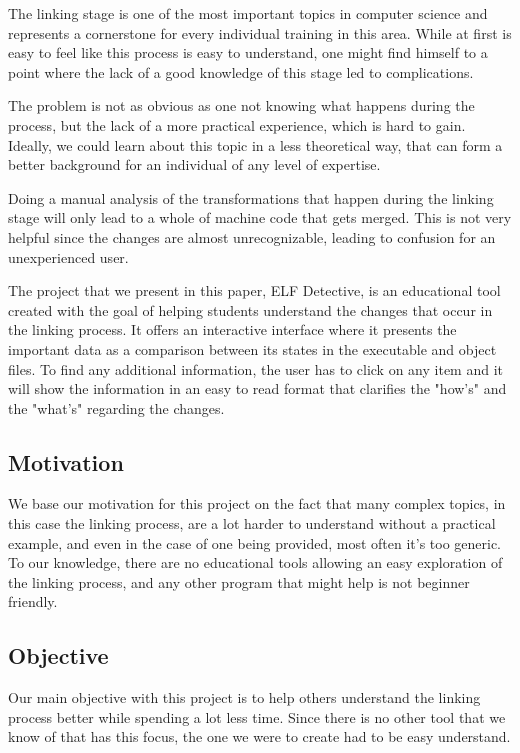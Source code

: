 The linking stage is one of the most important topics in computer science and represents a cornerstone for every individual training in this area. While at first is easy to feel like this process is easy to understand, one might find himself to a point where the lack of a good knowledge of this stage led to complications.

The problem is not as obvious as one not knowing what happens during the process, but the lack of a more practical experience, which is hard to gain. Ideally, we could learn about this topic in a less theoretical way, that can form a better background for an individual of any level of expertise. 

Doing a manual analysis of the transformations that happen during the linking stage will only lead to  a whole of machine code that gets merged. This is not very helpful since the changes are almost unrecognizable, leading to confusion for an unexperienced user.

The project that we present in this paper, ELF Detective, is an educational tool created with the goal of helping students understand the changes that occur in the linking process. It offers an interactive interface where it presents the important data as a comparison between its states in the executable and object files. To find any additional information, the user has to click on any item and it will show the information in an easy to read format that clarifies the "how's" and the "what's" regarding the changes.

\subsection{Motivation}
\label{sec:motivation}

We base our  motivation for this project on the fact that many complex topics, in this case the linking process, are a lot harder to understand without a practical example, and even in the case of one being provided, most often it's too generic. To our knowledge, there are no educational tools allowing an easy exploration of the linking process, and any other program that might help is not beginner friendly.

\subsection{Objective}
\label{sec:obj}

Our main objective with this project is to help others understand the linking process better while spending a lot less time. Since there is no other tool that we know of that has this focus, the one we were to create had to be easy understand.


